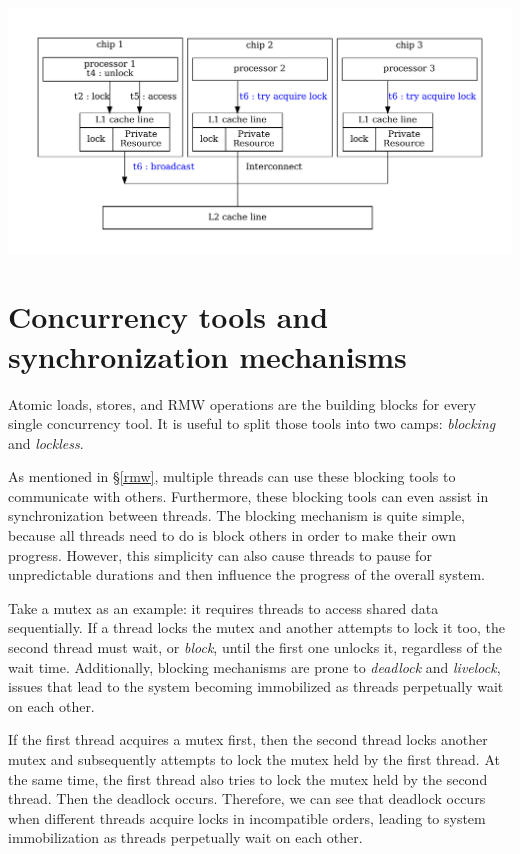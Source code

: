 \documentclass[fontsize=10pt, oneside]{scrartcl}
\newcommand{\introduce}[1]{\textit{#1}}
\newcommand{\secref}[1]{\hyperref[#1]{\textsc{\S}\ref*{#1}}}
\begin{document}
\includegraphics[keepaspectratio, width=0.9\linewidth]{images/spinlock}
\label{fig:spinlock}

\section{Concurrency tools and synchronization mechanisms}
\label{concurrency-tool}
Atomic loads, stores, and \textsc{RMW} operations are the building blocks for every single concurrency tool.
It is useful to split those tools into two camps:
\introduce{blocking} and \introduce{lockless}.

As mentioned in \secref{rmw}, multiple threads can use these blocking tools to communicate with others. 
Furthermore, these blocking tools can even assist in synchronization between threads. 
The blocking mechanism is quite simple, 
because all threads need to do is block others in order to make their own progress. 
However, this simplicity can also cause threads to pause for unpredictable durations and then influence the progress of the overall system.

Take a mutex as an example:
it requires threads to access shared data sequentially.
If a thread locks the mutex and another attempts to lock it too,
the second thread must wait, or \introduce{block},
until the first one unlocks it, regardless of the wait time.
Additionally, blocking mechanisms are prone to \introduce{deadlock} and \introduce{livelock},
issues that lead to the system becoming immobilized as threads perpetually wait on each other.

If the first thread acquires a mutex first, 
then the second thread locks another mutex and subsequently attempts to lock the mutex held by the first thread. 
At the same time, the first thread also tries to lock the mutex held by the second thread.
Then the deadlock occurs.
Therefore, we can see that deadlock occurs when different threads acquire locks in incompatible orders, 
leading to system immobilization as threads perpetually wait on each other. 
\end{document}
